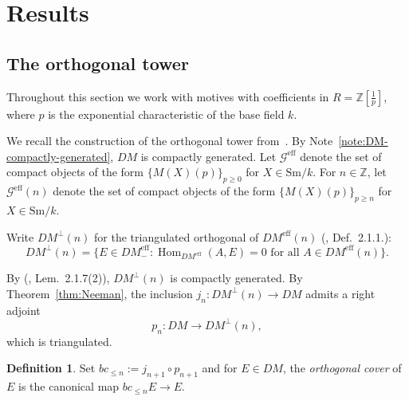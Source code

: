 \documentclass[12pt,a4paper]{article}
\theoremstyle{definition}
\newtheorem{definition}[theorem]{Definition}
\newcommand{\Sm}{\mathrm{Sm}}
\newcommand{\DMeff}{DM^{\mathrm{eff}}_{-}}
\newcommand{\Hom}{\operatorname{Hom}}
\newcommand{\Z}{\mathbb{Z}}
\begin{document}
\section{Results}
\label{sec:results}

\subsection{The orthogonal tower}
\label{subsec:orthogonal-tower}

Throughout this section we work with motives with coefficients in $R=\Z[\tfrac{1}{p}]$,
where $p$ is the exponential characteristic of the base field $k$.

We recall the construction of the orthogonal tower from~\cite{Pel17}.  By
Note~\ref{note:DM-compactly-generated}, $DM$ is compactly generated.  Let
$\mathcal{G}^{\mathrm{eff}}$ denote the set of compact objects of the form
$\{M(X)(p)\}_{p\geq 0}$ for $X\in\Sm/k$.  For $n\in\Z$, let
$\mathcal{G}^{\mathrm{eff}}(n)$ denote the set of compact objects of the form
$\{M(X)(p)\}_{p\geq n}$ for $X\in\Sm/k$.

Write $DM^\perp(n)$ for the triangulated orthogonal of $DM^{\mathrm{eff}}(n)$
(\cite{Pel17}, Def.\ 2.1.1.):
\[
  DM^\perp(n) = \bigl\{E\in\DMeff : \Hom_{DM^{\mathrm{eff}}}(A,E)=0
    \text{ for all }A\in DM^{\mathrm{eff}}(n)\bigr\}.
\]

By (\cite{Pel17}, Lem.\ 2.1.7(2)), $DM^\perp(n)$ is compactly generated.  By
Theorem~\ref{thm:Neeman}, the inclusion $j_n:DM^\perp(n)\to DM$ admits a right
adjoint
\[
  p_n : DM\longrightarrow DM^\perp(n),
\]
which is triangulated.

\begin{definition}\label{def:orthogonal-cover}
Set $bc_{\leq n}:=j_{n+1}\circ p_{n+1}$ and for $E\in DM$, the \emph{orthogonal
cover} of $E$ is the canonical map $bc_{\leq n}E\to E$.
\end{definition}
\end{document}
